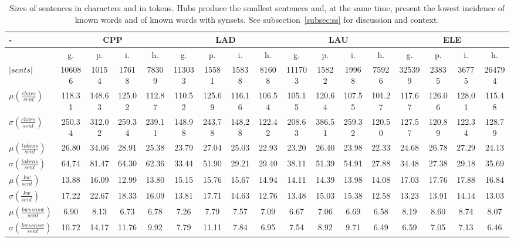 \documentclass[%
 aip,
 jmp,%
 amsmath,amssymb,
 reprint,%
]{revtex4-1}
\begin{document}
\begin{table}
  \centering
    \footnotesize
\setlength{\tabcolsep}{.16667em}
  \begin{tabular}{|l|| c|c|c|c||  c|c|c|c||   c|c|c|c||   c|c|c|c|}\hline
-\-  & \multicolumn{4}{c|}{CPP} & \multicolumn{4}{c|}{LAD} & \multicolumn{4}{c|}{LAU} & \multicolumn{4}{c|}{ELE} \\ \hline
 & g. & p. & i. & h. &     g. & p. & i. & h. &    g. & p. & i. & h. &    g. & p. & i. & h. \\\hline
$|sents|$ & 106086 & 10154 & 17618 & 78309 & 113033 & 15581 & 15838 & 81608 & 111703 & 15822 & 19968 & 75926 & 325399 & 23835 & 36775 & 264794 \\ \hline
$\mu\left(\frac{chars}{sent}\right)$ & 118.31 & 148.63 & 125.02 & 112.87 & 110.52 & 125.69 & 116.16 & 106.54 & 105.15 & 120.64 & 107.55 & 101.27 & 117.67 & 126.06 & 128.01 & 115.48 \\
$\sigma\left(\frac{chars}{sent}\right)$ & 250.34 & 312.02 & 259.34 & 239.11 & 148.98 & 243.78 & 148.28 & 122.42 & 208.63 & 386.51 & 259.32 & 120.50 & 127.57 & 120.89 & 122.34 & 128.79 \\ \hline
$\mu\left(\frac{tokens}{sent}\right)$ & 26.80 & 34.06 & 28.91 & 25.38 & 23.79 & 27.04 & 25.03 & 22.93 & 23.20 & 26.40 & 23.98 & 22.33 & 24.68 & 26.78 & 27.29 & 24.13 \\
$\sigma\left(\frac{tokens}{sent}\right)$ & 64.74 & 81.47 & 64.30 & 62.36 & 33.44 & 51.90 & 29.21 & 29.40 & 38.11 & 51.39 & 54.91 & 27.88 & 34.48 & 27.38 & 29.18 & 35.69 \\ \hline
$\mu\left(\frac{kw}{sent}\right)$ & 13.88 & 16.09 & 12.99 & 13.80 & 15.15 & 15.76 & 15.67 & 14.94 & 14.11 & 14.39 & 13.98 & 14.08 & 17.03 & 17.76 & 17.88 & 16.84 \\
$\sigma\left(\frac{kw}{sent}\right)$ & 17.22 & 22.67 & 18.33 & 16.09 & 13.81 & 17.71 & 14.63 & 12.76 & 13.48 & 15.03 & 15.38 & 12.58 & 13.23 & 13.91 & 14.14 & 13.03 \\ \hline
$\mu\left(\frac{kwssnsw}{sent}\right)$ & 6.90 & 8.13 & 6.73 & 6.78 & 7.26 & 7.79 & 7.57 & 7.09 & 6.67 & 7.06 & 6.69 & 6.58 & 8.19 & 8.60 & 8.74 & 8.07 \\
$\sigma\left(\frac{kwssnsw}{sent}\right)$ & 10.72 & 14.17 & 11.76 & 9.92 & 7.79 & 11.11 & 7.84 & 6.95 & 7.54 & 8.92 & 9.71 & 6.49 & 6.59 & 7.05 & 7.13 & 6.46 \\ \hline
  \end{tabular}
  \caption{Sizes of sentences in characters and in tokens. Hubs produce the smallest sentences and, at the same time, present the lowest incidence of known words and of known words with synsets. See subsection~\ref{subsec:ss} for discussion and context.}
  \label{tab:sizesSents}
\end{table}
\end{document}
